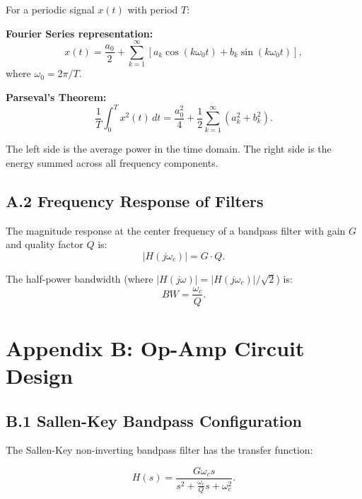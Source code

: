 \documentclass[11pt,letterpaper]{article}
\begin{document}
For a periodic signal $x(t)$ with period $T$:

\textbf{Fourier Series representation:}
\begin{equation}
x(t) = \frac{a_0}{2} + \sum_{k=1}^{\infty} \left[ a_k \cos(k\omega_0 t) + b_k \sin(k\omega_0 t) \right],
\end{equation}
where $\omega_0 = 2\pi / T$.

\textbf{Parseval's Theorem:}
\begin{equation}
\frac{1}{T} \int_0^T x^2(t) \, dt = \frac{a_0^2}{4} + \frac{1}{2} \sum_{k=1}^{\infty} (a_k^2 + b_k^2).
\end{equation}

The left side is the average power in the time domain. The right side is the energy summed across all frequency components.

\subsection*{A.2 Frequency Response of Filters}

The magnitude response at the center frequency of a bandpass filter with gain $G$ and quality factor $Q$ is:
\begin{equation}
|H(j\omega_c)| = G \cdot Q.
\end{equation}

The half-power bandwidth (where $|H(j\omega)| = |H(j\omega_c)| / \sqrt{2}$) is:
\begin{equation}
BW = \frac{\omega_c}{Q}.
\end{equation}

\clearpage

\section*{Appendix B: Op-Amp Circuit Design}

\subsection*{B.1 Sallen-Key Bandpass Configuration}

The Sallen-Key non-inverting bandpass filter has the transfer function:

\begin{equation}
H(s) = \frac{G \omega_c s}{s^2 + \frac{\omega_c}{Q} s + \omega_c^2}.
\end{equation}
\end{document}
